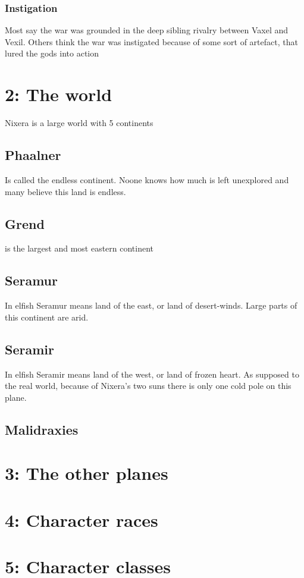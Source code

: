 \documentclass[a4paper]{article}
\begin{document}
\subsubsection{Instigation}
Most say the war was grounded in the deep sibling rivalry between Vaxel and Vexil. Others think the war was instigated because of some sort of artefact, that lured the gods into action 
\section{2: The world}
Nixera is a large world with 5 continents
\subsection{Phaalner}
Is called the endless continent. Noone knows how much is left unexplored and many believe this land is endless.
\subsection{Grend}
is the largest and most eastern continent
\subsection{Seramur}
In elfish Seramur means land of the east, or land of desert-winds. Large parts of this continent are arid.
\subsection{Seramir}
In elfish Seramir means land of the west, or land of frozen heart. As supposed to the real world, because of Nixera's two suns there is only one cold pole on this plane.
\subsection{Malidraxies}

\section{3: The other planes}

\section{4: Character races}

\section{5: Character classes}
\end{document}
